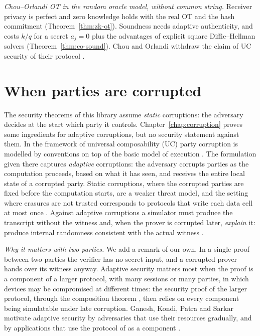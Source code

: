 \emph{Chou--Orlandi OT in the random oracle model, without common string.} Receiver privacy is
perfect and zero knowledge holds with the real OT and the hash commitment
(Theorem~\ref{thm:zk-ot}). Soundness needs adaptive authenticity, and costs $k/q$ for a secret
$a_j = 0$ plus the advantages of explicit square Diffie--Hellman solvers
(Theorem~\ref{thm:co-sound}). Chou and Orlandi withdraw the claim of UC security of their protocol
\cite[Sect.~1.1]{CO15}.

\section{When parties are corrupted}
\label{sec:corruptions}

The security theorems of this library assume \emph{static} corruptions: the adversary decides at
the start which party it controls. Chapter~\ref{chap:corruption} proves some ingredients for
adaptive corruptions, but no security statement against them. In
the framework of universal composability (UC) party
corruption is modelled by conventions on top of the basic model of execution
\cite[Sect.~7.1]{Can20}. The formulation given there captures \emph{adaptive} corruptions: the
adversary corrupts parties as the computation proceeds, based on what it has seen, and receives the
entire local state of a corrupted party. Static corruptions, where the corrupted parties are fixed
before the computation starts, are a weaker threat model, and the setting where erasures are not
trusted corresponds to protocols that write each data cell at most once
\cite[Sect.~7.1.1]{Can20}. Against adaptive corruptions a simulator must produce the transcript
without the witness and, when the prover is corrupted later, \emph{explain} it: produce internal
randomness consistent with the actual witness \cite[Sect.~1.2]{GKPS18}.

\emph{Why it matters with two parties.} We add a remark of our own. In a single proof between two
parties the verifier has no secret input, and a corrupted prover hands over its witness anyway.
Adaptive security matters most when the proof is a component of a larger protocol, with many
sessions or many parties, in which devices may be compromised at different times: the security
proof of the larger protocol, through the composition theorem \cite[Theorem~22]{Can20}, then relies
on every component being simulatable under late corruption. Ganesh, Kondi, Patra and Sarkar
motivate adaptive security by adversaries that use their resources gradually, and by applications
that use the protocol of \cite{JKO13} as a component \cite[Sect.~1.3]{GKPS18}.

